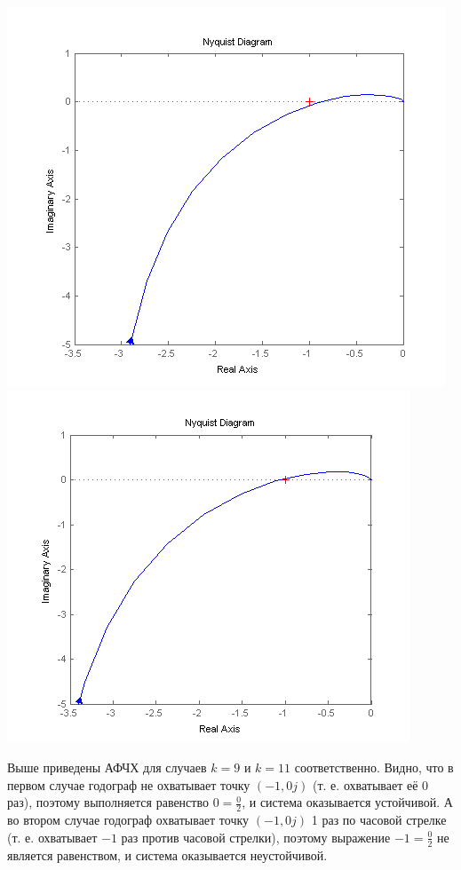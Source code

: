 \documentclass[a4paper,12pt]{article}
\newcommand{\ds}{\displaystyle}
\renewcommand{\^}[2]{#1^{\, #2} \kern -1pt}
\newcommand{\1}{\kern 1pt}
\newcommand{\0}{\kern -1pt}
\begin{document}
	\hspace{-2.0cm}\includegraphics[scale=0.75,page=1]{4_зад/nyquist_разомкнутой_исседование_k9}
	\includegraphics[scale=0.8,page=1]{4_зад/nyquist_разомкнутой_исседование_k11}
	
	Выше приведены АФЧХ для случаев $k = 9$ и $k = 11$ соответственно.
	Видно, что в первом случае годограф не охватывает точку $(-1,0 j)$ (т. е. охватывает её 0 раз), поэтому выполняется равенство $\ds 0 = \frac{0}{2}$, и система оказывается устойчивой.
	А во втором случае годограф охватывает точку $(-1,0 j)$ 1 раз по часовой стрелке (т. е. охватывает $-1$ раз против часовой стрелки), поэтому выражение $\ds -1 = \frac{0}{2}$ не является равенством, и система оказывается неустойчивой.
	
\end{document}
